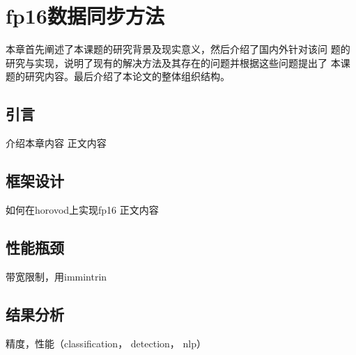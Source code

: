 \chapter{fp16数据同步方法}
本章首先阐述了本课题的研究背景及现实意义，然后介绍了国内外针对该问 题的研究与实现，说明了现有的解决方法及其存在的问题并根据这些问题提出了 本课题的研究内容。最后介绍了本论文的整体组织结构。
\section{引言}
介绍本章内容
正文内容
\section{框架设计}
如何在horovod上实现fp16
正文内容

\section{性能瓶颈}
带宽限制，用immintrin

\section{结果分析}
精度，性能（classification， detection， nlp）